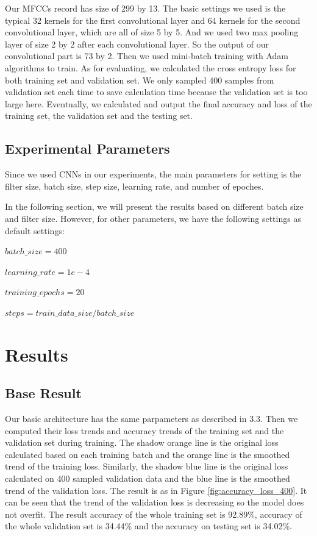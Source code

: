 \documentclass{article}
\begin{document}
Our MFCCs record has size of 299 by 13. The basic settings we used is the typical 32 kernels for the first convolutional layer and 64 kernels for the second convolutional layer, which are all of size 5 by 5. And we used two max pooling layer of size 2 by 2 after each convolutional layer. So the output of our convolutional part is 73 by 2. Then we used mini-batch training with Adam algorithms to train. As for evaluating, we calculated the cross entropy loss for both training set and validation set. We only sampled 400 samples from validation set each time to save calculation time because the validation set is too large here. Eventually, we calculated and output the final accuracy and loss of the training set, the validation set and the testing set.

\subsection{Experimental Parameters}

Since we used CNNs in our experiments, the main parameters for setting is the filter size, batch size, step size, learning rate, and number of epoches.

In the following section, we will present the results based on different batch size and filter size. However, for other parameters, we have the following settings as default settings:

\small
\setlength{\parindent}{5ex}
$batch\_size = 400$\par
\setlength{\parindent}{5ex}
$learning\_rate = 1e-4$\par
\setlength{\parindent}{5ex}
$training\_epochs = 20$\par
\setlength{\parindent}{5ex}
$steps = train\_data\_size/batch\_size$\par

\section{Results}

\subsection{Base Result}

Our basic architecture has the same parpameters as described in 3.3. Then we computed their loss trends and accuracy trends of the training set and the validation set during training. The shadow orange line is the original loss calculated based on each training batch and the orange line is the smoothed trend of the training loss. Similarly, the shadow blue line is the original loss calculated on 400 sampled validation data and the blue line is the smoothed trend of the validation loss. The result is as in Figure \ref{fig:accuracy_loss_400}. It can be seen that the trend of the validation loss is decreasing so the model does not overfit. The result accuracy of the whole training set is 92.89\%, accuracy of the whole validation set is 34.44\% and the accuracy on testing set is 34.02\%.
\end{document}
